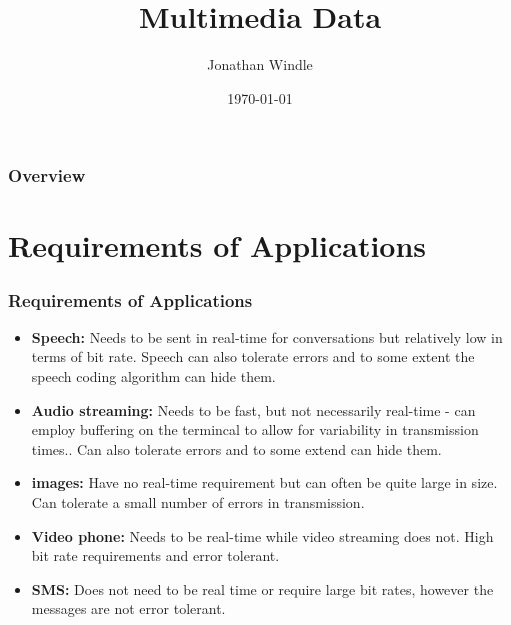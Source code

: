 \documentclass{beamer}
\title[Multimedia Data]{Multimedia Data} %
\author{Jonathan Windle} %
\institute[UEA] %
{
University of East Anglia \\ %
\medskip
\textit{J.Windle@uea.ac.uk} %
}
\date{\today} %
\begin{document}
\begin{frame}
\titlepage %
\end{frame}

\begin{frame}[allowframebreaks]
\frametitle{Overview} %
\tableofcontents %
\end{frame}

\section{Requirements of Applications}
\begin{frame}
\frametitle{Requirements of Applications}
\begin{itemize}
\item \textbf{Speech:} Needs to be sent in real-time for conversations but relatively low in terms of bit rate. Speech can also tolerate errors and to some extent the speech coding algorithm can hide them.
\item \textbf{Audio streaming:} Needs to be fast, but not necessarily real-time - can employ buffering on the termincal to allow for variability in transmission times.. Can also tolerate errors and to some extend can hide them.
\item \textbf{images:} Have no real-time requirement but can often be quite large in size. Can tolerate a small number of errors in transmission.
\item \textbf{Video phone:} Needs to be real-time while video streaming does not. High bit rate requirements and error tolerant.
\item \textbf{SMS:} Does not need to be real time or require large bit rates, however the messages are not error tolerant.
\end{itemize}
\end{frame}
\end{document}
